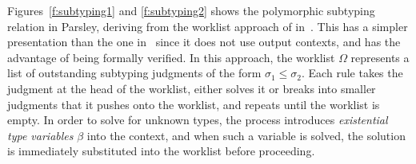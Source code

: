 \documentclass[letterpaper]{article}
\begin{document}
Figures~\ref{f:subtyping1} and \ref{f:subtyping2} shows the
polymorphic subtyping relation in Parsley, deriving from the worklist
approach of in~\cite{zhao2018,zhao19:bidir}.  This has a simpler
presentation than the one in~\cite{Dunfield13:bidir} since it does not
use output contexts, and has the advantage of being formally verified.
In this approach, the worklist $\Omega$ represents a list of
outstanding subtyping judgments of the form $\sigma_1\leq\sigma_2$.
Each rule takes the judgment at the head of the worklist, either
solves it or breaks into smaller judgments that it pushes onto the
worklist, and repeats until the worklist is empty.  In order to solve
for unknown types, the process introduces {\em existential type
  variables} $\beta$ into the context, and when such a variable is
solved, the solution is immediately substituted into the worklist
before proceeding.
\end{document}
